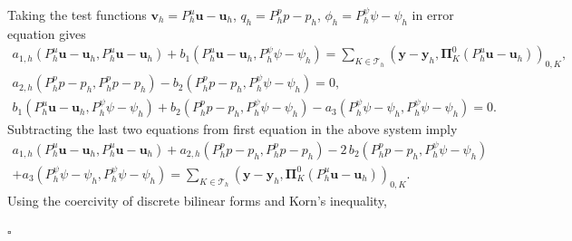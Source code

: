 \documentclass[smallextended]{svjour3}
\renewenvironment{proof}{\noindent{\it Proof.}}{\hfill$\square$}
\numberwithin{equation}{section}
\numberwithin{figure}{section}
\numberwithin{table}{section}
\newcommand\bPi{\boldsymbol{\Pi}}
\newcommand\beps{\boldsymbol{\varepsilon}}
\newcommand\by{\boldsymbol{y}}
\newcommand\bu{\boldsymbol{u}}
\newcommand\bv{\boldsymbol{v}}
\newcommand\cT{\mathcal{T}}
\begin{document}
	\begin{proof}
		Taking the test functions $\bv_h =P_h^u \bu - \bu_h$, $q_h =P_h^p p - p_h$, $\phi_h =P_h^{\psi} \psi - \psi_h$ in error equation
        gives
		\begin{equation*}
			\begin{aligned}
				a_{1,h}(P_h^u \bu - \bu_h, P_h^u \bu - \bu_h) +  b_1(P_h^u \bu - \bu_h, P_h^{\psi} \psi - \psi_h)     = \sum_{K \in \cT_h} ( \by - \by_h, \bPi^{0}_K (P_h^u \bu - \bu_h) )_{0,K},\\
				 a_{2,h}(P_h^p p - p_h, P_h^p p - p_h)   -    b_2(P_h^p p - p_h, P_h^{\psi} \psi - \psi_h )  = 0, \qquad \qquad \\
				b_1(P_h^u \bu - \bu_h, P_h^{\psi} \psi - \psi_h)    +  b_2(P_h^p p - p_h, P_h^{\psi} \psi - \psi_h)- a_3(P_h^\psi \psi - \psi_h, P_h^{\psi} \psi - \psi_h)  =0. \qquad  \qquad
			\end{aligned}
		\end{equation*}
		Subtracting the last two equations from first equation in the above system imply
		\begin{align*}
			a_{1,h}(P_h^u \bu - \bu_h, P_h^u \bu - \bu_h)  + a_{2,h}(P_h^p p - p_h, P_h^p p - p_h)  -  2  \, b_2(P_h^p p - p_h, P_h^{\psi} \psi - \psi_h ) \\
			+ a_3(P_h^\psi \psi - \psi_h, P_h^{\psi} \psi - \psi_h) = \sum_{K \in \cT_h} ( \by - \by_h, \bPi^{0}_K (P_h^u \bu - \bu_h) )_{0,K}.
		\end{align*}
		Using the coercivity of discrete bilinear forms and Korn's inequality, 

\end{proof}
\end{document}
